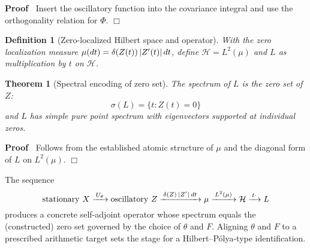 \documentclass{article}
\newenvironment{proof}{\noindent\textbf{Proof\ }}{\hspace*{\fill}$\Box$\medskip}
\newtheorem{definition}{Definition}
\newtheorem{theorem}{Theorem}
\begin{document}
\begin{proof}
  Insert the oscillatory function into the covariance integral and use the
  orthogonality relation for $\Phi$.
\end{proof}

\begin{definition}
  [Zero-localized Hilbert space and operator] With the zero localization
  measure $\mu (dt) = \delta (Z (t)) \hspace{0.17em} |Z' (t) | 
  \hspace{0.17em} dt$, define $\mathcal{H}= L^2 (\mu)$ and $L$ as
  multiplication by $t$ on $\mathcal{H}$.
\end{definition}

\begin{theorem}
  [Spectral encoding of zero set] The spectrum of $L$ is the zero set of $Z$:
  \begin{equation}
    \sigma (L) = \{t : Z (t) = 0\}
  \end{equation}
  and $L$ has simple pure point spectrum with eigenvectors supported at
  individual zeros.
\end{theorem}

\begin{proof}
  Follows from the established atomic structure of $\mu$ and the diagonal form
  of $L$ on $L^2 (\mu)$.
\end{proof}

\begin{remark}
   The sequence
  \begin{equation}
    \text{stationary } X \xrightarrow{\hspace{0.17em} U_{\theta}
    \hspace{0.17em}} \text{oscillatory } Z \xrightarrow{\hspace{0.17em} \delta
    (Z) \hspace{0.17em} |Z' |  \hspace{0.17em} dt \hspace{0.17em}} \mu
    \xrightarrow{\hspace{0.17em} L^2 (\mu) \hspace{0.17em}} \mathcal{H}
    \xrightarrow{\hspace{0.17em} t \cdot \hspace{0.17em}} L
  \end{equation}
  produces a concrete self-adjoint operator whose spectrum equals the
  (constructed) zero set governed by the choice of $\theta$ and $F$. Aligning
  $\theta$ and $F$ to a prescribed arithmetic target sets the stage for a
  Hilbert--P{\'o}lya-type identification.
\end{remark}
\end{document}
